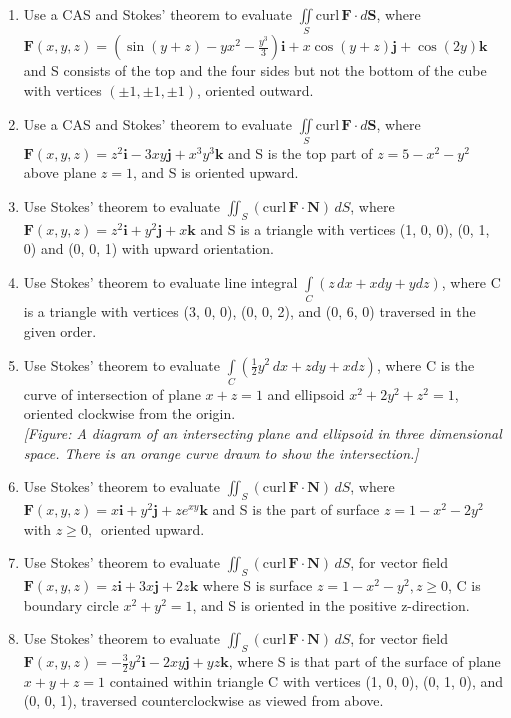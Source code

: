 \documentclass{exercises}
\begin{document}
\begin{enumerate}[resume]
\item \techrequired Use a CAS and Stokes' theorem to evaluate $\underset{S}{\iint}\text{curl}\,\mathbf{F}\cdot d\mathbf{S}$, where $\mathbf{F}(x,y,z)=(\sin(y+z)-yx^{2}-\frac{y^{3}}{3})\mathbf{i}+x\cos(y+z)\mathbf{j}+\cos(2y)\mathbf{k}$ and S consists of the top and the four sides but not the bottom of the cube with vertices $(\pm1,\pm1,\pm1)$, oriented outward.
\item \techrequired Use a CAS and Stokes' theorem to evaluate $\underset{S}{\iint}\text{curl}\,\mathbf{F}\cdot d\mathbf{S}$, where $\mathbf{F}(x,y,z)=z^{2}\mathbf{i}-3xy\mathbf{j}+x^{3}y^{3}\mathbf{k}$ and S is the top part of $z=5-x^{2}-y^{2}$ above plane $z=1$, and S is oriented upward.
\item Use Stokes' theorem to evaluate $\iint_{S}(\text{curl}\,\mathbf{F}\cdot \mathbf{N})\,dS$, where $\mathbf{F}(x,y,z)=z^{2}\mathbf{i}+y^{2}\mathbf{j}+x\mathbf{k}$ and S is a triangle with vertices (1, 0, 0), (0, 1, 0) and (0, 0, 1) with upward orientation.
\item Use Stokes' theorem to evaluate line integral $\underset{C}{\int}(z\,dx+xdy+ydz)$, where C is a triangle with vertices (3, 0, 0), (0, 0, 2), and (0, 6, 0) traversed in the given order.
\item Use Stokes' theorem to evaluate $\underset{C}{\int}(\frac{1}{2}y^{2}\,dx+zdy+xdz)$, where C is the curve of intersection of plane $x+z=1$ and ellipsoid $x^{2}+2y^{2}+z^{2}=1$, oriented clockwise from the origin. \\ \textit{[Figure: A diagram of an intersecting plane and ellipsoid in three dimensional space. There is an orange curve drawn to show the intersection.]}
\item Use Stokes' theorem to evaluate $\iint_{S}(\text{curl}\,\mathbf{F}\cdot \mathbf{N})\,dS$, where $\mathbf{F}(x,y,z)=x\mathbf{i}+y^{2}\mathbf{j}+ze^{xy}\mathbf{k}$ and S is the part of surface $z=1-x^{2}-2y^{2}$ with $z\ge0,\,$ oriented upward.
\item Use Stokes' theorem to evaluate $\iint_{S}(\text{curl}\,\mathbf{F}\cdot \mathbf{N})\,dS$, for vector field $\mathbf{F}(x,y,z)=z\mathbf{i}+3x\mathbf{j}+2z\mathbf{k}$ where S is surface $z=1-x^{2}-y^{2},z\ge0$, C is boundary circle $x^{2}+y^{2}=1$, and S is oriented in the positive z-direction.
\item Use Stokes' theorem to evaluate $\iint_{S}(\text{curl}\,\mathbf{F}\cdot \mathbf{N})\,dS$, for vector field $\mathbf{F}(x,y,z)=-\frac{3}{2}y^{2}\mathbf{i}-2xy\mathbf{j}+yz\mathbf{k}$, where S is that part of the surface of plane $x+y+z=1$ contained within triangle C with vertices (1, 0, 0), (0, 1, 0), and (0, 0, 1), traversed counterclockwise as viewed from above.

\end{enumerate}
\end{document}
